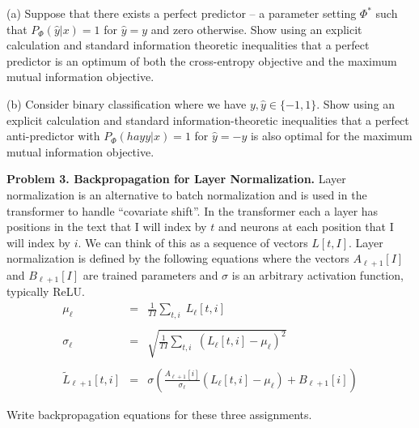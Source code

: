 \documentclass{article}
\begin{document}
\medskip

(a) Suppose that there exists a perfect predictor -- a parameter setting $\Phi^*$ such that $P_\Phi(\hat{y}|x) = 1$ for $\hat{y} = y$ and zero otherwise.
Show using an explicit calculation and standard information theoretic inequalities that a perfect predictor
is an optimum of both the cross-entropy objective and the maximum mutual information objective.  

(b) Consider binary classification where we have $y,\hat{y} \in \{-1,1\}$.  Show using an explicit calculation and standard information-theoretic inequalities
that a perfect anti-predictor with $P_\Phi(hay{y}|x) = 1$ for $\hat{y}= -y$
is also optimal for the maximum mutual information objective.

\bigskip

{\bf Problem 3.  Backpropagation for Layer Normalization.} Layer normalization is an alternative to batch normalization and is used in the transformer to handle ``covariate shift''. In the transformer each a layer has positions in the text that I will index by $t$ and neurons at each position that I will index by $i$.
We can think of this as a sequence of vectors $L[t,I]$.
Layer normalization is defined by the following equations where the vectors $A_{\ell+1}[I]$ and $B_{\ell+1}[I]$ are trained parameters and $\sigma$ is an
arbitrary activation function, typically ReLU.
\begin{eqnarray*}
  \mu_\ell & = & \frac{1}{TI} \sum_{t,i} \;L_\ell[t,i] \\
  \\
  \sigma_{\ell} & = & \sqrt{\frac{1}{TI} \sum_{t,i}\;(L_\ell[t,i] - \mu_\ell)^2} \\
  \\
  \tilde{L}_{\ell+1}[t,i] & = & \sigma\left(\frac{A_{\ell+1}[i]}{\sigma_\ell}(L_\ell[t,i] -\mu_\ell) + B_{\ell+1}[i]\right)
\end{eqnarray*}

Write backpropagation equations for these three assignments.
\end{document}
